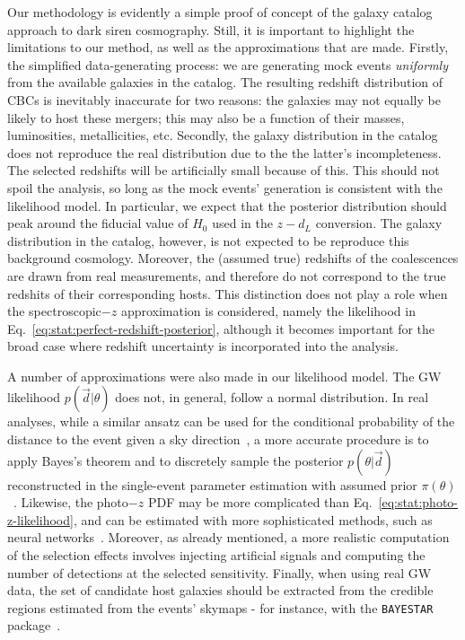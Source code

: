 \documentclass[%
preprint,
nofootinbib,
 amsmath,amssymb,
 aps,
]{revtex4-2}
\newcommand{\given}[2]{p( #1 | #2 )}
\begin{document}
Our methodology is evidently a simple proof of concept of the galaxy catalog approach to dark siren
cosmography. Still, it is important to highlight the limitations to our method, as well as the
approximations that are made. Firstly, the simplified data-generating process: we are generating
mock events \textit{uniformly} from the available galaxies in the catalog. The resulting redshift
distribution of CBCs is inevitably inaccurate for two reasons: the galaxies may not equally be
likely to host these mergers; this may also be a function of their masses, luminosities,
metallicities, etc. Secondly, the galaxy distribution in the catalog does not reproduce the real
distribution due to the the latter's incompleteness. The selected redshifts will be artificially
small because of this. This should not spoil the analysis, so long as the mock events' generation
is consistent with the likelihood model. In particular, we expect that the posterior distribution
should peak around the fiducial value of $H_0$ used in the $z-d_L$ conversion. The galaxy
distribution in the catalog, however, is not expected to be reproduce this background cosmology.
Moreover, the (assumed true) redshifts of the coalescences are drawn from real measurements, and
therefore do not correspond to the true redshits of their corresponding hosts. This distinction
does not play a role when the spectroscopic$-z$ approximation is considered, namely the likelihood
in Eq.~\eqref{eq:stat:perfect-redshift-posterior}, although it becomes important for the broad case
where redshift uncertainty is incorporated into the analysis.

A number of approximations were also made in our likelihood model. The GW likelihood
$\given{\vec{d}}{\theta}$ does not, in general, follow a normal distribution. In real analyses,
while a similar ansatz can be used for the conditional probability of the distance to the event
given a sky direction~\cite{Singer_2016}, a more accurate procedure is to apply Bayes's theorem and
to discretely sample the posterior $\given{\theta}{\vec{d}}$ reconstructed in the single-event
parameter estimation with assumed prior $\pi (\theta)$~\cite{Mandel:2018mve}. Likewise, the
photo$-z$ PDF may be more complicated than Eq.~\eqref{eq:stat:photo-z-likelihood}, and can be
estimated with more sophisticated methods, such as neural
networks~\cite{Palmese_2023,alfradique2023dark}. Moreover, as already mentioned, a more realistic
computation of the selection effects involves injecting artificial signals and computing the number
of detections at the selected sensitivity. Finally, when using real GW data, the set of candidate
host galaxies should be extracted from the credible regions estimated from the events' skymaps -
for instance, with the \texttt{BAYESTAR} package~\cite{PhysRevD.93.024013}.
\end{document}

